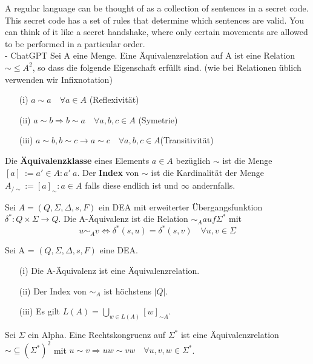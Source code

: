 {
  A regular language can be thought of as a collection of sentences in a secret code. This secret code has a set of rules that determine which sentences are valid. You can think of it like a secret handshake, where only certain movements are allowed to be performed in a particular order.\\ \hspace*{\fill} - ChatGPT
}
  Sei A eine Menge. Eine Äquivalenzrelation auf A ist eine Relation \(\sim \leq A^{2}\), so dass die folgende Eigenschaft erfüllt sind. (wie bei Relationen üblich verwenden wir Infixnotation)
  \begin{itemize}
    \item [(i)] \(a \sim a \quad \forall a \in A\)  (Reflexivität)
    \item [(ii)] \(a \sim b \Rightarrow  b \sim a \quad \forall a, b, c \in A\) (Symetrie)
    \item [(iii)] \(a \sim b, b \sim c \rightarrow a \sim c \quad \forall a, b, c \in A\)(Transitivität)
  \end{itemize}
  Die \textbf{Äquivalenzklasse} eines Elements \(a \in A\) bezüglich \(\sim\) ist die Menge \([a]_{~} := {a' \in A : a' ~a}\). Der \textbf{Index} von \(\sim\) ist die Kardinalität der Menge \(A_{/\sim} := {[a]_{\sim} : a \in A}\) falls diese endlich ist und \(\infty\)  andernfalls.

  Sei \(A = (Q, \Sigma, \Delta, s, F)\) ein DEA mit erweiterter Übergangsfunktion \(\delta^{*}: Q \times \Sigma \rightarrow Q\). Die A-Äquivalenz ist die Relation \(\sim_A auf \Sigma^{*}\) mit 
\[
  u \sim_A v \Leftrightarrow \delta^*(s, u) = \delta^*(s,v) \quad \forall u, v \in \Sigma
\]

Sei A = \((Q, \Sigma, \Delta, s, F)\) eine DEA.
\begin{itemize}
  \item [(i)] Die A-Äquivalenz ist eine Äquivalenzrelation.
  \item [(ii)] Der Index von \(\sim_{A}\) ist höchstens \(|Q|\).
  \item [(iii)] Es gilt \(L(A) = \bigcup \limits_{w \in L(A)} [w]_{\sim A}\).
\end{itemize}

  Sei \(\Sigma\) ein Alpha. Eine Rechtskongruenz auf \(\Sigma^{*}\) ist eine Äquivalenzrelation \(\sim \subseteq (\Sigma^{*})^{2}\) mit \(u \sim v \Rightarrow uw \sim vw \quad \forall u, v, w \in \Sigma^{*}\).

